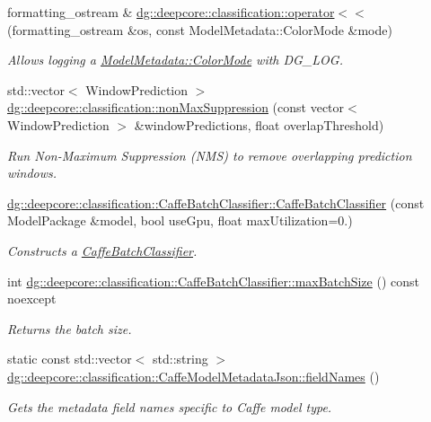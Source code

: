 \begin{DoxyCompactItemize}
formatting\+\_\+ostream \& \hyperlink{group___classification_module_ga2ca3a003d928630b46eed89e774eda35}{dg\+::deepcore\+::classification\+::operator$<$$<$} (formatting\+\_\+ostream \&os, const Model\+Metadata\+::\+Color\+Mode \&mode)
\begin{DoxyCompactList}\small\item\em Allows logging a \hyperlink{group___classification_module_gafa8e703c3646c5f93ada56f3c811aac7}{Model\+Metadata\+::\+Color\+Mode} with D\+G\+\_\+\+L\+OG. \end{DoxyCompactList}\item 
std\+::vector$<$ Window\+Prediction $>$ \hyperlink{group___classification_module_ga30426b4ff4fd24cceff0dda284ea4a05}{dg\+::deepcore\+::classification\+::non\+Max\+Suppression} (const vector$<$ Window\+Prediction $>$ \&window\+Predictions, float overlap\+Threshold)
\begin{DoxyCompactList}\small\item\em Run Non-\/\+Maximum Suppression (N\+MS) to remove overlapping prediction windows. \end{DoxyCompactList}\item 
\hyperlink{group___classification_module_ga8501a61fcaf492b0fe8b43b4e9440085}{dg\+::deepcore\+::classification\+::\+Caffe\+Batch\+Classifier\+::\+Caffe\+Batch\+Classifier} (const Model\+Package \&model, bool use\+Gpu, float max\+Utilization=0.)
\begin{DoxyCompactList}\small\item\em Constructs a \hyperlink{classdg_1_1deepcore_1_1classification_1_1_caffe_batch_classifier}{Caffe\+Batch\+Classifier}. \end{DoxyCompactList}\item 
int \hyperlink{group___classification_module_ga7871db221a66762c7c7247df6b53391d}{dg\+::deepcore\+::classification\+::\+Caffe\+Batch\+Classifier\+::max\+Batch\+Size} () const noexcept
\begin{DoxyCompactList}\small\item\em Returns the batch size. \end{DoxyCompactList}\item 
static const std\+::vector$<$ std\+::string $>$ \hyperlink{group___classification_module_gafcf3ba2ab411e7a7a232dcb4d8be8bcd}{dg\+::deepcore\+::classification\+::\+Caffe\+Model\+Metadata\+Json\+::field\+Names} ()
\begin{DoxyCompactList}\small\item\em Gets the metadata field names specific to Caffe model type. \end{DoxyCompactList}\item 

\end{DoxyCompactItemize}
